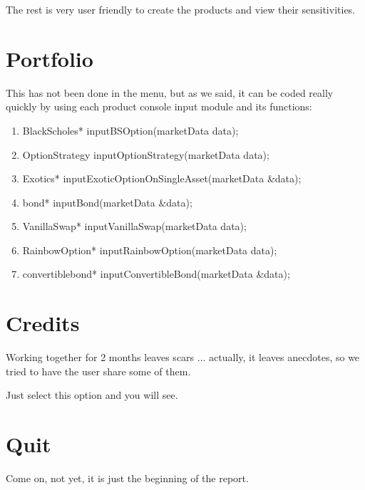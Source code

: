 The rest is very user friendly to create the products and view their sensitivities.


\section{Portfolio}

This has not been done in the menu, but as we said, it can be coded really quickly by using each product console input module and its functions:
\begin{enumerate}
	\item BlackScholes* inputBSOption(marketData data);
	\item OptionStrategy inputOptionStrategy(marketData data);
	\item Exotics* inputExoticOptionOnSingleAsset(marketData \&data);
	\item bond* inputBond(marketData \&data);
	\item VanillaSwap* inputVanillaSwap(marketData data);
	\item RainbowOption* inputRainbowOption(marketData data);
	\item convertiblebond* inputConvertibleBond(marketData \&data);
\end{enumerate}



\section{Credits}

Working together for 2 months leaves scars ... actually, it leaves anecdotes, so we tried to have the user share some of them.

Just select this option and you will see.




\section{Quit}

Come on, not yet, it is just the beginning of the report.